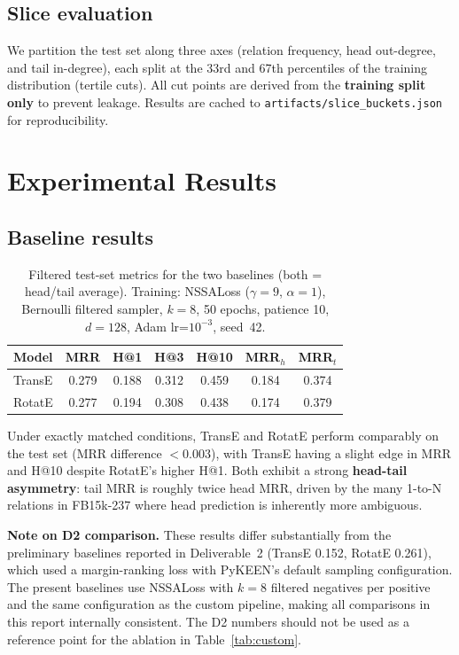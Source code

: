\documentclass[10pt,twocolumn,letterpaper]{article}
\begin{document}
\subsection{Slice evaluation}

We partition the test set along three axes (relation frequency, head
out-degree, and tail in-degree), each split at the 33rd and 67th percentiles
of the training distribution (tertile cuts). All cut points are derived from
the \textbf{training split only} to prevent leakage. Results are cached to
\texttt{artifacts/slice\_buckets.json} for reproducibility.

\section{Experimental Results}
\label{sec:results}

\subsection{Baseline results}

\begin{table}[h]
\centering\small
\caption{Filtered test-set metrics for the two baselines (both = head/tail
average). Training: NSSALoss ($\gamma=9$, $\alpha=1$), Bernoulli filtered
sampler, $k=8$, 50 epochs, patience 10, $d=128$, Adam lr=$10^{-3}$, seed~42.}
\label{tab:baselines}
\begin{tabular}{@{}lcccccc@{}}
\toprule
Model & MRR & H@1 & H@3 & H@10 & MRR$_h$ & MRR$_t$ \\
\midrule
TransE  & 0.279 & 0.188 & 0.312 & 0.459 & 0.184 & 0.374 \\
RotatE  & 0.277 & 0.194 & 0.308 & 0.438 & 0.174 & 0.379 \\
\bottomrule
\end{tabular}
\end{table}

Under exactly matched conditions, TransE and RotatE perform comparably on
the test set (MRR difference $<0.003$), with TransE having a slight edge in
MRR and H@10 despite RotatE's higher H@1. Both exhibit a strong
\textbf{head-tail asymmetry}: tail MRR is roughly twice head MRR, driven by
the many 1-to-N relations in FB15k-237 where head prediction is inherently
more ambiguous.

\textbf{Note on D2 comparison.}
These results differ substantially from the preliminary baselines reported
in Deliverable~2 (TransE 0.152, RotatE 0.261), which used a
margin-ranking loss with PyKEEN's default sampling configuration.
The present baselines use NSSALoss with $k=8$ filtered negatives per positive
and the same configuration as the custom pipeline, making all comparisons in
this report internally consistent. The D2 numbers should not be used as a
reference point for the ablation in Table~\ref{tab:custom}.
\end{document}
